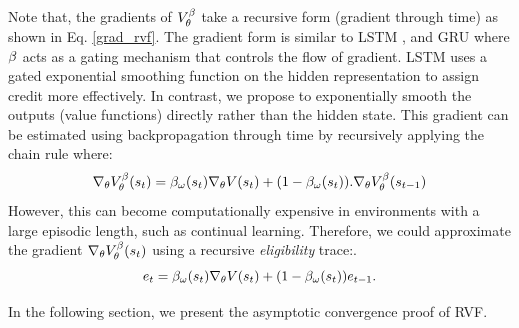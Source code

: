 Note that, the gradients of $V^{\beta}_{\theta}$ take a recursive form (gradient through time) as shown in Eq. \ref{grad_rvf}. The gradient form is similar to LSTM \cite{hochreiter1997long}, and GRU \cite{chung2014empirical} where $\beta$ acts as a gating mechanism that controls the flow of gradient. LSTM uses a gated exponential smoothing function on the hidden representation to assign credit more effectively. In contrast, we propose to exponentially smooth the outputs (value functions) directly rather than the hidden state. This gradient can be estimated using backpropagation through time by recursively applying the chain rule where:
 \begin{equation}
\label{grad_rvf}
\nabla_{\theta} V^{\beta}_{\theta} (s_t) = \beta_{\omega}(s_t) \nabla_{\theta} V(s_t) + (1-\beta_{\omega}(s_t)). \nabla_{\theta} V^{\beta}_{\theta}(s_{t-1})
\end{equation}
However, this can become computationally expensive in environments with a large episodic length, such as continual learning. Therefore, we could approximate the gradient $\nabla_{\theta}V^{\beta}_{\theta}(s_{t})$ using a recursive \emph{eligibility} trace:.
\begin{equation}
\label{trace}
    e_t = \beta_{\omega}(s_t) \nabla_{\theta} V (s_t) + (1-\beta_{\omega}(s_t)) e_{t-1}.
\end{equation}

In the following section, we present the asymptotic convergence proof of RVF.

